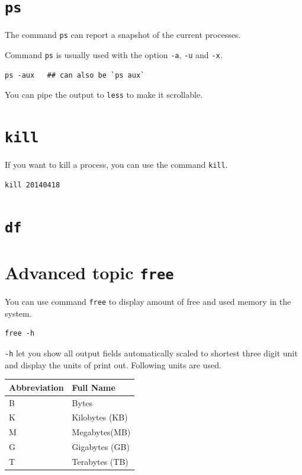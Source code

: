 \documentclass[]{book}
\begin{document}
\hypertarget{ps}{%
\section{\texorpdfstring{\texttt{ps}}{ps}}\label{ps}}

The command \texttt{ps} can report a snapshot of the current processes.

Command \texttt{ps} is usually used with the option \texttt{-a}, \texttt{-u} and \texttt{-x}.

\begin{verbatim}
ps -aux   ## can also be `ps aux`
\end{verbatim}

You can pipe the output to \texttt{less} to make it scrollable.

\hypertarget{kill}{%
\section{\texorpdfstring{\texttt{kill}}{kill}}\label{kill}}

If you want to kill a process, you can use the command \texttt{kill}.

\begin{verbatim}
kill 20140418
\end{verbatim}

\hypertarget{df}{%
\section{\texorpdfstring{\texttt{df}}{df}}\label{df}}

\hypertarget{advanced-topic-free}{%
\section{\texorpdfstring{Advanced topic \texttt{free}}{Advanced topic free}}\label{advanced-topic-free}}

You can use command \texttt{free} to display amount of free and used memory in the system.

\begin{verbatim}
free -h
\end{verbatim}

\texttt{-h} let you show all output fields automatically scaled to shortest three digit unit and display the units of print out. Following units are used.

\begin{longtable}[]{@{}ll@{}}
\toprule
Abbreviation & Full Name\tabularnewline
\midrule
\endhead
B & Bytes\tabularnewline
K & Kilobytes (KB)\tabularnewline
M & Megabytes(MB)\tabularnewline
G & Gigabytes (GB)\tabularnewline
T & Terabytes (TB)\tabularnewline
\bottomrule
\end{longtable}
\end{document}

